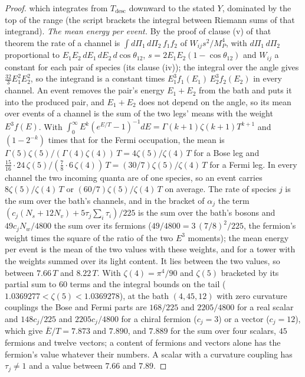 \documentclass[11pt]{article}
\theoremstyle{definition}
\theoremstyle{plain}
\begin{document}
\begin{proof}
which integrates from $T_{\mathrm{desc}}$ downward to the stated $Y$, dominated by the top of the range (the script brackets the integral between Riemann sums of that integrand). \emph{The mean energy per event.} By the proof of clause (v) of that theorem the rate of a channel is $\int d\Pi_{1}\,d\Pi_{2}\,f_{1}f_{2}$ of $W_{ij}s^{2}/M_{P}^{4}$, with $d\Pi_{1}\,d\Pi_{2}$ proportional to $E_{1}E_{2}\,dE_{1}\,dE_{2}\,d\cos\theta_{12}$, $s = 2E_{1}E_{2}(1 - \cos\theta_{12})$ and $W_{ij}$ a constant for each pair of species (its clause (iv)); the integral over the angle gives $\tfrac{32}{3}E_{1}^{2}E_{2}^{2}$, so the integrand is a constant times $E_{1}^{3}f_{1}(E_{1})\,E_{2}^{3}f_{2}(E_{2})$ in every channel. An event removes the pair's energy $E_{1} + E_{2}$ from the bath and puts it into the produced pair, and $E_{1} + E_{2}$ does not depend on the angle, so its mean over events of a channel is the sum of the two legs' means with the weight $E^{3}f(E)$. With $\int_{0}^{\infty}E^{k}(e^{E/T} - 1)^{-1}dE = \Gamma(k+1)\zeta(k+1)T^{k+1}$ and $(1 - 2^{-k})$ times that for the Fermi occupation, the mean is $\Gamma(5)\zeta(5)/(\Gamma(4)\zeta(4))\,T = 4\zeta(5)/\zeta(4)\,T$ for a Bose leg and $\tfrac{15}{16}\cdot 24\,\zeta(5)/(\tfrac78 \cdot 6\,\zeta(4))\,T = (30/7)\zeta(5)/\zeta(4)\,T$ for a Fermi leg. In every channel the two incoming quanta are of one species, so an event carries $8\zeta(5)/\zeta(4)\,T$ or $(60/7)\zeta(5)/\zeta(4)\,T$ on average. The rate of species $j$ is the sum over the bath's channels, and in the bracket of $\alpha_{j}$ the term $(c_{j}(N_{s} + 12N_{v}) + 5\tau_{j}\sum_{i}\tau_{i})/225$ is the sum over the bath's bosons and $49c_{j}N_{w}/4800$ the sum over its fermions ($49/4800 = 3\,(7/8)^{2}/225$, the fermion's weight times the square of the ratio of the two $E^{3}$ moments); the mean energy per event is the mean of the two values with these weights, and for a tower with the weights summed over its light content. It lies between the two values, so between $7.66\,T$ and $8.22\,T$. With $\zeta(4) = \pi^{4}/90$ and $\zeta(5)$ bracketed by its partial sum to $60$ terms and the integral bounds on the tail ($1.0369277 < \zeta(5) < 1.0369278$), at the bath $(4, 45, 12)$ with zero curvature couplings the Bose and Fermi parts are $168/225$ and $2205/4800$ for a real scalar and $148c_{j}/225$ and $2205c_{j}/4800$ for a chiral fermion ($c_{j} = 3$) or a vector ($c_{j} = 12$), which give $\bar{E}/T = 7.873$ and $7.890$, and $7.889$ for the sum over four scalars, $45$ fermions and twelve vectors; a content of fermions and vectors alone has the fermion's value whatever their numbers. A scalar with a curvature coupling has $\tau_{j} \neq 1$ and a value between $7.66$ and $7.89$.


\end{proof}
\end{document}
